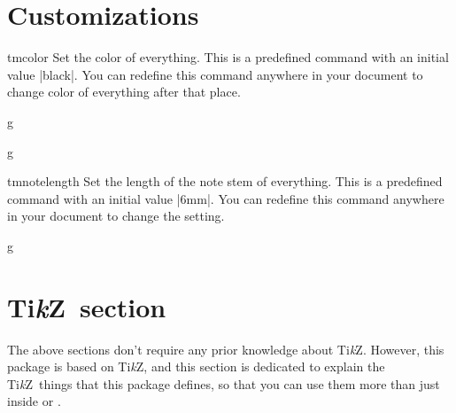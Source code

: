 \documentclass[11pt,a4paper]{ltxdoc}
\newcommand\tikzname{Ti\emph{k}Z}
\begin{document}
\section{Customizations}\label{sec:custom}
\begin{docCommand}{tmcolor}{}
  Set the color of everything. This is a predefined command with an initial value 
  |black|. You can redefine this command anywhere in your document to change 
  color of everything after that place.
\end{docCommand}
\begin{dispExample}
\begin{tmmultiplestaves}[0pt]%
  \begin{tmstaff}{g}
    \renewcommand\tmcolor{red}
    \renewcommand\tmcolor{black}
  \end{tmstaff}%
  \begin{tmstaff}{g}
    \begingroup
      \renewcommand\tmcolor{red}
    \endgroup
  \end{tmstaff}%
\end{tmmultiplestaves}
\end{dispExample}
\begin{docCommand}{tmnotelength}{}
  Set the length of the note stem of everything. This is a predefined command 
  with an initial value |6mm|. You can redefine this command anywhere in your 
  document to change the setting.
\end{docCommand}
\begin{dispExample}
\begin{tmsinglestaff}%
  \begin{tmstaff}{g}
    \begin{tmbeam}
      \renewcommand\tmnotelength{1.8cm}
    \end{tmbeam}
  \end{tmstaff}%
\end{tmsinglestaff}
\end{dispExample}
\section{\tikzname\ section}\label{sec:tikz}
The above sections don't require any prior knowledge about \tikzname. However, 
this package is based on \tikzname, and this section is dedicated to explain the 
\tikzname\ things that this package defines, so that you can use them more than 
just inside  or .
\end{document}
